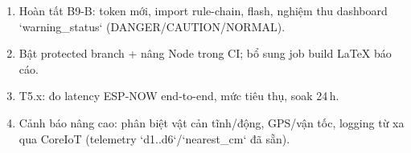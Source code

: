 \begin{enumerate}
\item Hoàn tất B9-B: token mới, import rule-chain, flash, nghiệm thu dashboard
  `warning\_status` (DANGER/CAUTION/NORMAL).
\item Bật protected branch + nâng Node trong CI; bổ sung job build LaTeX báo cáo.
\item T5.x: đo latency ESP-NOW end-to-end, mức tiêu thụ, soak 24\,h.
\item Cảnh báo nâng cao: phân biệt vật cản tĩnh/động, GPS/vận tốc, logging từ xa qua
  CoreIoT (telemetry `d1..d6`/`nearest\_cm` đã sẵn).
\end{enumerate}